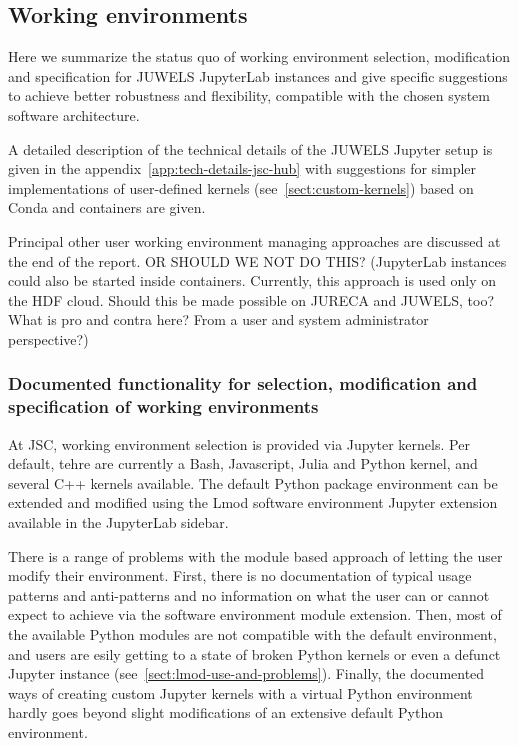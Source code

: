 
\subsection{Working environments}

Here we summarize the status quo of working environment selection, modification and specification for JUWELS JupyterLab instances and give specific suggestions to achieve better robustness and flexibility, compatible with the chosen system software architecture.

A detailed description of the technical details of the JUWELS Jupyter setup is given in the appendix~\ref{app:tech-details-jsc-hub} with suggestions for simpler implementations of user-defined kernels (see~\ref{sect:custom-kernels}) based on Conda and containers are given.

Principal other user working environment managing approaches are discussed at the end of the report. OR SHOULD WE NOT DO THIS? (JupyterLab instances could also be started inside containers. Currently, this approach is used only on the HDF cloud. Should this be made possible on JURECA and JUWELS, too? What is pro and contra here? From a user and system administrator perspective?)

\subsubsection{Documented functionality for selection, modification and specification of working environments}

At JSC, working environment selection is provided via Jupyter kernels.
Per default, tehre are currently a Bash, Javascript, Julia and Python kernel, and several C++ kernels available.
The default Python package environment can be extended and modified using the Lmod software environment Jupyter extension available in the JupyterLab sidebar.

There is a range of problems with the module based approach of letting the user modify their environment.
First, there is no documentation of typical usage patterns and anti-patterns and no information on what the user can or cannot expect to achieve via the software environment module extension.
Then, most of the available Python modules are not compatible with the default environment, and users are esily getting to a state of broken Python kernels or even a defunct Jupyter instance (see~\ref{sect:lmod-use-and-problems}).
Finally, the documented ways of creating custom Jupyter kernels with a virtual Python environment hardly goes beyond slight modifications of an extensive default Python environment.

